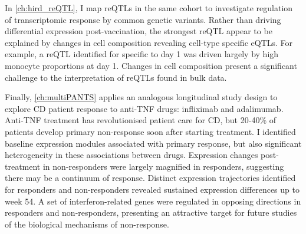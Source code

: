 In \cref{ch:hird_reQTL}, I map \glspl{reQTL} in the same cohort to investigate regulation of transcriptomic response by common genetic variants.
Rather than driving differential expression post-vaccination,
the strongest \gls{reQTL} appear to be explained by changes in cell composition revealing cell-type specific \glspl{eQTL}.
For example, a \gls{reQTL} identified for  specific to day 1 was driven largely by high monocyte proportions at day 1.
Changes in cell composition present a significant challenge to the interpretation of \glspl{reQTL} found in bulk data.

Finally, \cref{ch:multiPANTS} applies an analogous longitudinal study design to explore \gls{CD} patient response to anti-\gls{TNF} drugs: infliximab and adalimumab.
Anti-\gls{TNF} treatment has revolutionised patient care for \gls{CD},
but 20-40\% of patients develop primary non-response soon after starting treatment.
I identified baseline expression modules associated with primary response, but also significant heterogeneity in these associations between drugs.
Expression changes post-treatment in non-responders were largely magnified in responders, suggesting there may be a continuum of response.
Distinct expression trajectories identified for responders and non-responders revealed sustained expression differences up to week 54.
A set of interferon-related genes were regulated in opposing directions in responders and non-responders,
presenting an attractive target for future studies of the biological mechanisms of non-response.

